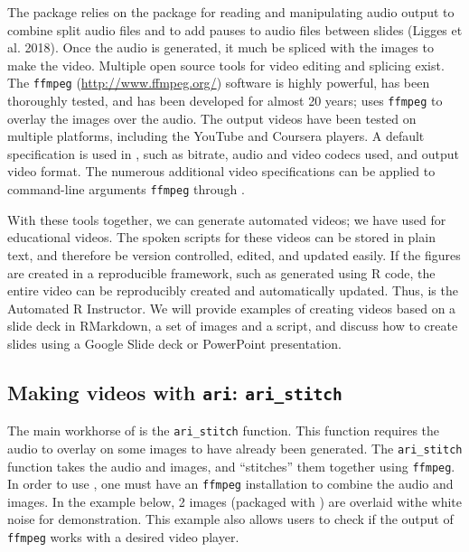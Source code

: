 The  package relies on the  package for reading
and manipulating audio output to combine split audio files and to add
pauses to audio files between slides (Ligges et al. 2018). Once the
audio is generated, it much be spliced with the images to make the
video. Multiple open source tools for video editing and splicing exist.
The \texttt{ffmpeg} (\url{http://www.ffmpeg.org/}) software is highly
powerful, has been thoroughly tested, and has been developed for almost
20 years;  uses \texttt{ffmpeg} to overlay the images over the
audio. The output videos have been tested on multiple platforms,
including the YouTube and Coursera players. A default specification is
used in , such as bitrate, audio and video codecs used, and
output video format. The numerous additional video specifications can be
applied to command-line arguments \texttt{ffmpeg} through .

With these tools together, we can generate automated videos; we have
used  for educational videos. The spoken scripts for these
videos can be stored in plain text, and therefore be version controlled,
edited, and updated easily. If the figures are created in a reproducible
framework, such as generated using R code, the entire video can be
reproducibly created and automatically updated. Thus,  is the
Automated R Instructor. We will provide examples of creating videos
based on a slide deck in RMarkdown, a set of images and a script, and
discuss how to create slides using a Google Slide deck or PowerPoint
presentation.

\hypertarget{making-videos-with-ari-ari_stitch}{%
\subsection{\texorpdfstring{Making videos with \texttt{ari}:
\texttt{ari\_stitch}}{Making videos with ari: ari\_stitch}}\label{making-videos-with-ari-ari_stitch}}

The main workhorse of  is the \texttt{ari\_stitch} function.
This function requires the audio to overlay on some images to have
already been generated. The \texttt{ari\_stitch} function takes the
audio and images, and ``stitches'' them together using \texttt{ffmpeg}.
In order to use , one must have an \texttt{ffmpeg} installation
to combine the audio and images. In the example below, 2 images
(packaged with ) are overlaid withe white noise for
demonstration. This example also allows users to check if the output of
\texttt{ffmpeg} works with a desired video player.


